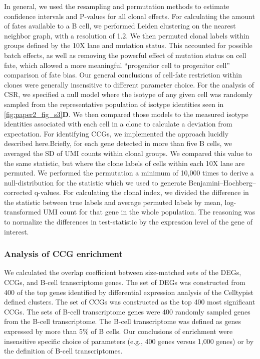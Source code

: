 In general, we used the resampling and permutation methods to estimate confidence intervals and P-values for all clonal effects. For calculating the amount of fates available to a B cell, we performed Leiden clustering on the nearest neighbor graph, with a resolution of 1.2. We then permuted clonal labels within groups defined by the 10X lane and mutation status. This accounted for possible batch effects, as well as removing the powerful effect of mutation status on cell fate, which allowed a more meaningful “progenitor cell to progenitor cell” comparison of fate bias. Our general conclusions of cell-fate restriction within clones were generally insensitive to different parameter choice. For the analysis of CSR, we specified a null model where the isotype of any given cell was randomly sampled from the representative population of isotype identities seen in \ref{fig:paper2_fig_s3}\textbf{D}. We then compared those models to the measured isotype identities associated with each cell in a clone to calculate a deviation from expectation. For identifying CCGs, we implemented the approach lucidly described here\cite{horton_multiplexed_2018}.Briefly, for each gene detected in more than five B cells, we averaged the SD of UMI counts within clonal groups. We compared this value to the same statistic, but where the clone labels of cells within each 10X lane are permuted. We performed the permutation a minimum of 10,000 times to derive a null-distribution for the statistic which we used to generate Benjamini–Hochberg–corrected q-values. For calculating the clonal index, we divided the difference in the statistic between true labels and average permuted labels by mean, log-transformed UMI count for that gene in the whole population. The reasoning was to normalize the differences in test-statistic by the expression level of the gene of interest.
\subsubsection{Analysis of CCG enrichment}
We calculated the overlap coefficient between size-matched sets of the DEGs, CCGs, and B-cell transcriptome genes. The set of DEGs was constructed from 400 of the top genes identified by differential expression analysis of the Celltypist defined clusters. The set of CCGs was constructed as the top 400 most significant CCGs. The sets of B-cell transcriptome genes were 400 randomly sampled genes from the B-cell transcriptome. The B-cell transcriptome was defined as genes expressed by more than 5\% of B cells. Our conclusions of enrichment were insensitive specific choice of parameters (e.g., 400 genes versus 1,000 genes) or by the definition of B-cell transcriptomes.

